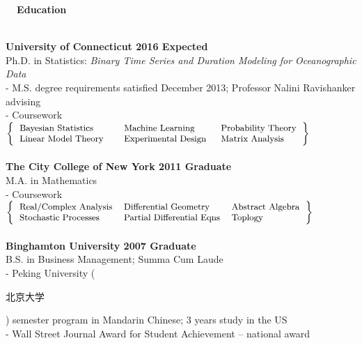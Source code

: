 \documentclass{article}
\begin{document}
\begin{large}
\noindent
  \hspace{-1.0cm}
  \textbf{~~Education}
  \vspace{0.1cm}
\end{large}\\
\noindent
\textbf{University of Connecticut \hfill 2016 Expected~~~~~~~~~~~~~~~}\\
Ph.D. in Statistics: \textit{Binary Time Series and Duration Modeling for Oceanographic Data}\\
- M.S. degree requirements satisfied December 2013; Professor Nalini Ravishanker advising \vspace{0.1cm} \\
- Coursework~~
$\left \{
\begin{small}
\begin{tabular}{ l l l}
Bayesian Statistics & Machine Learning & Probability Theory\\
Linear Model Theory~~~ & Experimental Design~ & Matrix Analysis
\\
\end{tabular}
\end{small}
\right \}
$
\\
\\
\textbf{The City College of New York \hfill 2011 Graduate~~~~~~~~~~~~~~~}\\
M.A. in Mathematics \vspace{0.1cm} \\ 
- Coursework~~
$\left \{
\begin{small}
\begin{tabular}{ l l l}
Real/Complex Analysis & Differential Geometry & Abstract Algebra\\
Stochastic Processes & Partial Differential Eqns & Toplogy\\
\end{tabular}
\end{small}
\right \}
$
\\
\\
\textbf{Binghamton University \hfill 2007 Graduate~~~~~~~~~~~~~~~}\\
B.S. in Business Management; Summa Cum Laude\\
- Peking University (\begin{CJK*}{UTF8}{gbsn}北京大学\end{CJK*}) semester program in Mandarin Chinese; 3 years study in the US\\
- Wall Street Journal Award for Student Achievement – national award
\end{document}
